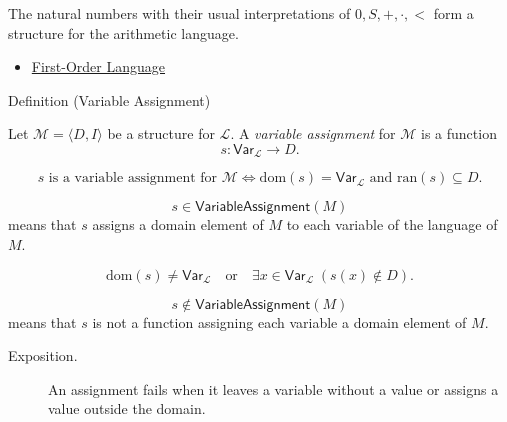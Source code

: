 \begin{remark*}[Examples]
The natural numbers with their usual interpretations of \(0,S,+,\cdot,<\)
form a structure for the arithmetic language.
\end{remark*}

\begin{dependencies}
\begin{itemize}
  \item \hyperref[def:fo-language]{First-Order Language}
\end{itemize}
\end{dependencies}

\begin{definitionbox}{Definition (Variable Assignment)}
\begin{definition}
\label{def:var-assign}
Let \(\mathcal M=\langle D,I\rangle\) be a structure for \(\mathcal L\).
A \emph{variable assignment} for \(\mathcal M\) is a function
\[
s:\mathsf{Var}_{\mathcal L}\to D.
\]
\end{definition}
\end{definitionbox}

\begin{remark*}
\[
s \text{ is a variable assignment for } \mathcal M
\Longleftrightarrow
\mathrm{dom}(s)=\mathsf{Var}_{\mathcal L}
\text{ and }
\mathrm{ran}(s)\subseteq D.
\]
\end{remark*}

\begin{remark*}
\[
  s\in\mathsf{VariableAssignment}(M)
\] means that \(s\) assigns a domain
element of \(M\) to each variable of the language of \(M\).
\end{remark*}

\begin{remark*}
\[
\mathrm{dom}(s)\neq\mathsf{Var}_{\mathcal L}
\quad\text{or}\quad
\exists x\in\mathsf{Var}_{\mathcal L}\;(s(x)\notin D).
\]
\end{remark*}

\begin{remark*}
\[
  s\notin\mathsf{VariableAssignment}(M)
\] means that \(s\) is not a
function assigning each variable a domain element of \(M\).
\end{remark*}

\begin{remark*}
\begin{description}
  \item[Exposition.] An assignment fails when it leaves a variable without a value or assigns a
value outside the domain.
\end{description}
\end{remark*}

